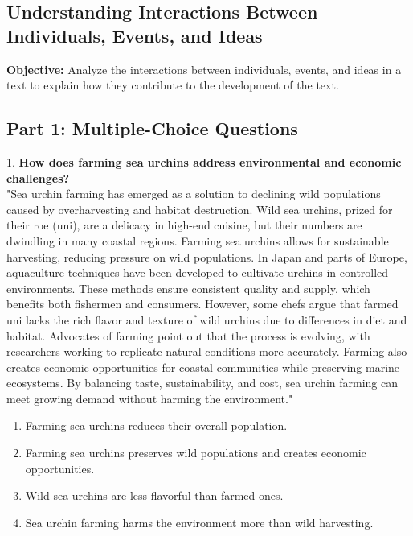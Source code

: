 \documentclass[12pt]{article}
\begin{document}
\subsection*{Understanding Interactions Between Individuals, Events, and Ideas}
\onehalfspacing

\begin{tcolorbox}[colframe=black!40, colback=gray!0, title=Learning Objective]
\textbf{Objective:} Analyze the interactions between individuals, events, and ideas in a text to explain how they contribute to the development of the text.
\end{tcolorbox}

\subsection*{Part 1: Multiple-Choice Questions}

1. \textbf{How does farming sea urchins address environmental and economic \\challenges?}\\
"Sea urchin farming has emerged as a solution to declining wild populations caused by overharvesting and habitat destruction. Wild sea urchins, prized for their roe (uni), are a delicacy in high-end cuisine, but their numbers are dwindling in many coastal regions. Farming sea urchins allows for sustainable harvesting, reducing pressure on wild populations. In Japan and parts of Europe, aquaculture techniques have been developed to cultivate urchins in controlled environments. These methods ensure consistent quality and supply, which benefits both fishermen and consumers. However, some chefs argue that farmed uni lacks the rich flavor and texture of wild urchins due to differences in diet and habitat. Advocates of farming point out that the process is evolving, with researchers working to replicate natural conditions more accurately. Farming also creates economic opportunities for coastal communities while preserving marine ecosystems. By balancing taste, sustainability, and cost, sea urchin farming can meet growing demand without harming the environment."  
\begin{enumerate}[label=\Alph*.]
    \item Farming sea urchins reduces their overall population.  
    \item Farming sea urchins preserves wild populations and creates economic \\opportunities.  
    \item Wild sea urchins are less flavorful than farmed ones.  
    \item Sea urchin farming harms the environment more than wild harvesting.  
\end{enumerate}
\end{document}
